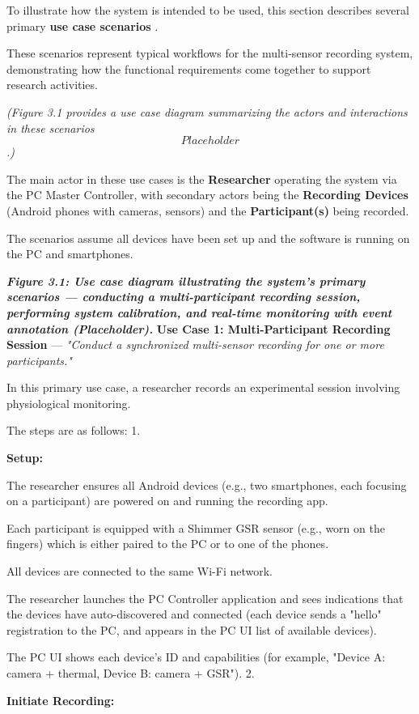 To illustrate how the system is intended to be used, this section describes several primary \textbf{use case scenarios}
.

These scenarios represent typical workflows for the multi-sensor recording system, demonstrating how the functional requirements come together to support research activities.

\textit{(Figure 3.1 provides a use case diagram summarizing the actors and interactions in these scenarios \[Placeholder\].)}

The main actor in these use cases is the \textbf{Researcher}
 operating the system via the PC Master Controller, with secondary actors being the \textbf{Recording Devices}
 (Android phones with cameras, sensors) and the \textbf{Participant(s)}
 being recorded.

The scenarios assume all devices have been set up and the software is running on the PC and smartphones.

\textit{\textbf{Figure 3.1: Use case diagram illustrating the system's primary scenarios --- conducting a multi-participant recording session, performing system calibration, and real-time monitoring with event annotation (Placeholder).}
} \textbf{Use Case 1: Multi-Participant Recording Session}
 --- \textit{"Conduct a synchronized multi-sensor recording for one or more participants."}

In this primary use case, a researcher records an experimental session involving physiological monitoring.

The steps are as follows: 1.

\textbf{Setup:}

The researcher ensures all Android devices (e.g., two smartphones, each focusing on a participant) are powered on and running the recording app.

Each participant is equipped with a Shimmer GSR sensor (e.g., worn on the fingers) which is either paired to the PC or to one of the phones.

All devices are connected to the same Wi-Fi network.

The researcher launches the PC Controller application and sees indications that the devices have auto-discovered and connected (each device sends a "hello" registration to the PC, and appears in the PC UI list of available devices).

The PC UI shows each device's ID and capabilities (for example, "Device A: camera + thermal, Device B: camera + GSR"). 2.

\textbf{Initiate Recording:}

